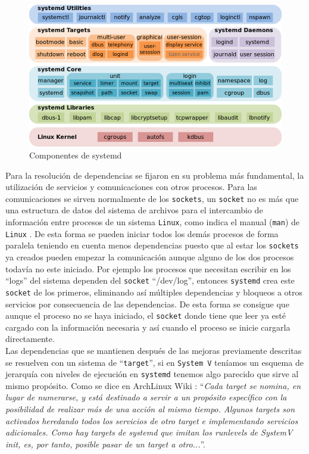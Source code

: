 \begin{figure}[H] %
\centering
\includegraphics[scale=0.5]{./imagenes/systemd_components.png} 
\caption{Componentes de systemd} \label{fig:systemd_components}
\end{figure}

Para la resolución de dependencias se fijaron en su problema más fundamental, la utilización de servicios y comunicaciones con otros procesos. Para las comunicaciones se sirven normalmente de los \texttt{sockets}, un \texttt{socket} no es más que una estructura de datos del sistema de archivos para el intercambio de información entre procesos de un sistema \texttt{Linux}, como indica el manual (\texttt{man}) de \texttt{Linux} \cite{socket}. De esta forma se pueden iniciar todos los demás procesos de forma paralela teniendo en cuenta menos dependencias puesto que al estar los \texttt{sockets} ya creados pueden empezar la comunicación aunque alguno de los dos procesos todavía no este iniciado. Por ejemplo los procesos que necesitan escribir en los ``logs'' del sistema dependen del \texttt{socket} ``/dev/log'', entonces \texttt{systemd} crea este \texttt{socket} de los primeros, eliminando así múltiples dependencias y bloqueos a otros servicios por consecuencia de las dependencias. De esta forma se consigue que aunque el proceso no se haya iniciado, el \texttt{socket} donde tiene que leer ya esté cargado con la información necesaria y así cuando el proceso se inicie cargarla directamente. \\

Las dependencias que se mantienen después de las mejoras previamente descritas se resuelven con un sistema de ``\texttt{target}'', si en \texttt{System V} teníamos un esquema de jerarquía con niveles de ejecución en \texttt{systemd} tenemos algo parecido que sirve al mismo propósito. Como se dice en ArchLinux Wiki \cite{systemd_es}: ``\textit{Cada target se nomina, en lugar de numerarse, y está destinado a servir a un propósito específico con la posibilidad de realizar más de una acción al mismo tiempo. Algunos targets son activados heredando todos los servicios de otro target e implementando servicios adicionales. Como hay targets de systemd que imitan los runlevels de SystemV init, es, por tanto, posible pasar de un target a otro...}''.\\


